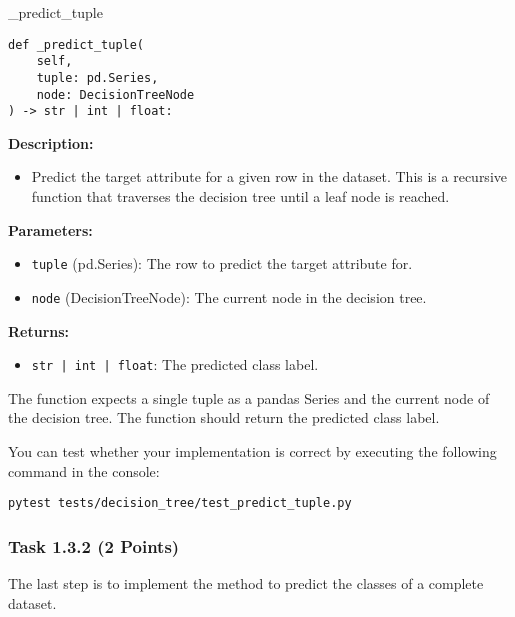 \documentclass[
english,
smallborders
]{i6prcsht}
\newcommand{\points}[1]{\hfill \color{red}(#1 Points)\color{black}}
\begin{document}
\begin{functionbox}{\_predict\_tuple}
	\begin{lstlisting}[numbers=none]
def _predict_tuple(
    self, 
    tuple: pd.Series, 
    node: DecisionTreeNode
) -> str | int | float:
\end{lstlisting}
	
	\textbf{Description:}
	\begin{itemize}[leftmargin=*,topsep=0pt]
		\item Predict the target attribute for a given row in the dataset. This is a recursive function that traverses the decision tree until a leaf node is reached.
	\end{itemize}
	
	\textbf{Parameters:}
	\begin{itemize}[leftmargin=*,topsep=0pt]
		\item \texttt{tuple} (pd.Series): The row to predict the target attribute for.
		\item \texttt{node} (DecisionTreeNode): The current node in the decision tree.
	\end{itemize}
	
	\textbf{Returns:}
	\begin{itemize}[leftmargin=*,topsep=0pt]
		\item \texttt{str | int | float}: The predicted class label.
	\end{itemize}
\end{functionbox}

\vspace*{0.5cm}

The function expects a single tuple as a pandas Series and the current node of the decision tree. The function should return the predicted class label.

You can test whether your implementation is correct by executing the following command in the console:

\vspace*{0.3cm}

\begin{lstlisting}
pytest tests/decision_tree/test_predict_tuple.py
\end{lstlisting}

\newpage

\subsubsection*{Task 1.3.2 \points{2}}

The last step is to implement the method to predict the classes of a complete dataset.
\end{document}
